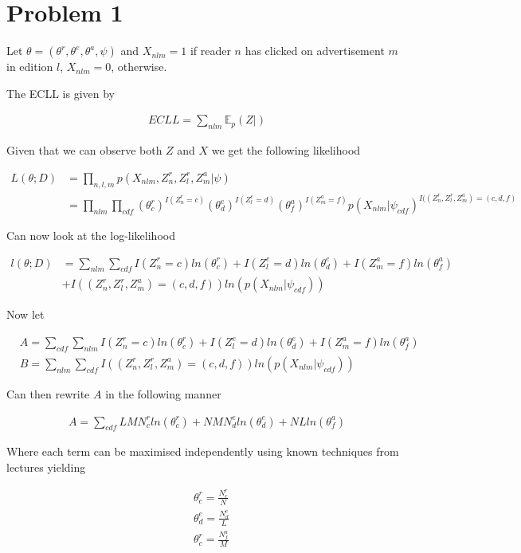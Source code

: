 \section*{Problem 1}
Let $\theta = (\theta^r, \theta^e, \theta^a, \psi)$ and $X_{nlm} = 1$ if reader $n$ has clicked on advertisement $m$ in edition $l$, $X_{nlm} = 0$, otherwise.


The ECLL is given by

\begin{align*}
  ECLL = \sum_{nlm} \mathbb{E}_p(Z|)
\end{align*}










Given that we can observe both $Z$ and $X$ we get the following likelihood

\begin{align*}
  L(\theta; D) & = \prod_{n,l,m}p(X_{nlm}, Z_n^r, Z_l^r, Z_m^a | \psi) \\
  & = \prod_{nlm} \prod_{cdf} (\theta_c^r)^{ I(Z_n^r = c)} (\theta_d^e)^{ I(Z_l^e = d)}
  (\theta_f^a)^{ I(Z_m^a = f)} p(X_{nlm} |\psi_{cdf})^{I((Z_n^r, Z_l^r, Z_m^a) = (c,d,f)}
\end{align*}

Can now look at the log-likelihood

\begin{align*}
    l(\theta; D) & = \sum_{nlm}\sum_{cdf} I(Z_n^r = c) ln(\theta_c^r) + I(Z_l^e = d) ln(\theta_d^e)
    + I(Z_m^a = f) ln(\theta_f^a) \\
    & + I((Z_n^r, Z_l^r, Z_m^a) = (c,d,f)) ln(p(X_{nlm} |\psi_{cdf}))
\end{align*}

Now let

\begin{align*}
  & A = \sum_{cdf}\sum_{nlm} I(Z_n^r = c) ln(\theta_c^r) + I(Z_l^e = d) ln(\theta_d^e)
  + I(Z_m^a = f) ln(\theta_f^a) \\
  & B = \sum_{nlm}\sum_{cdf} I((Z_n^r, Z_l^r, Z_m^a) = (c,d,f)) ln(p(X_{nlm} |\psi_{cdf}))
\end{align*}

Can then rewrite $A$ in the following manner

\begin{align*}
  A = \sum_{cdf} LM N_c^r ln(\theta_c^r) + NM N_d^e ln(\theta_d^e) + NL ln(\theta_f^a)
\end{align*}

Where each term can be maximised independently using known techniques from lectures yielding

\begin{align*}
  & \theta_c^r = \frac{N^r_c}{N} \\
  & \theta_d^e = \frac{N^e_d}{L} \\
  & \theta_c^r = \frac{N^a_f}{M}
\end{align*}
